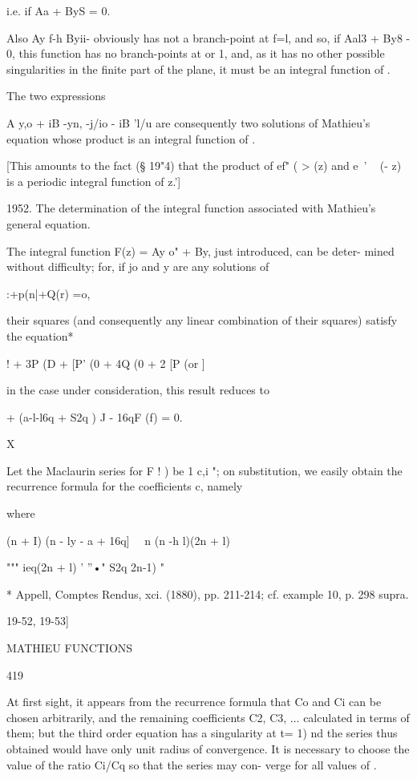 i.e. if Aa + ByS = 0.

Also Ay f-h Byii- obviously has not a branch-point at f=l, and so, if
Aal3 + By8 - 0, this function has no branch-points at or 1, and, as it
has no other possible singularities in the finite part of the plane,
it must be an integral function of .

The two expressions

A y,o + iB -yn, -j/io - iB 'l/u are consequently two solutions of
Mathieu's equation whose product is an integral function of .

[This amounts to the fact (§ 19"4) that the product of ef" ( > (z) and
e~' ~ (- z) is a periodic integral function of z.']

1952. The determination of the integral function associated with
Mathieu's general equation.

The integral function F(z) = Ay o" + By, just introduced, can be
deter- mined without difficulty; for, if jo and y are any solutions
of

 :+p(n|+Q(r) =o,

their squares (and consequently any linear combination of their
squares) satisfy the equation*

 ! + 3P (D + [P' (0 + 4Q (0 + 2 [P (or ]

in the case under consideration, this result reduces to

+ (a-l-l6q + S2q ) J - 16qF (f) = 0.

X

Let the Maclaurin series for F ! ) be 1 c,i "; on substitution, we
easily obtain the recurrence formula for the coefficients c, namely

where

(n + I) (n - ly - a + 16q] \ \ n (n -h l)(2n + l)

""" ieq(2n + l) ' ''•" S2q 2n-1) "

* Appell, Comptes Rendus, xci. (1880), pp. 211-214; cf. example 10,
p. 298 supra.

19-52, 19-53]

MATHIEU FUNCTIONS

419

At first sight, it appears from the recurrence formula that Co and Ci
can be chosen arbitrarily, and the remaining coefficients C2, C3, ...
calculated in terms of them; but the third order equation has a
singularity at t= 1) nd the series thus obtained would have only unit
radius of convergence. It is necessary to choose the value of the
ratio Ci/Cq so that the series may con- verge for all values of .

